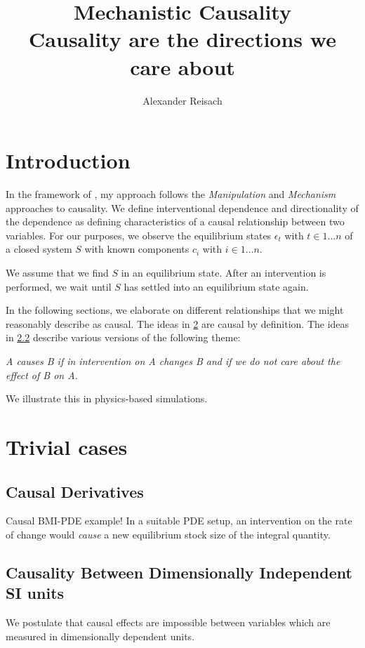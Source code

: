 \documentclass{article}
\title{Mechanistic Causality\\
    \Large{Causality are the directions we care about}}
\author{Alexander Reisach}
\begin{document}
\maketitle
    
\section{Introduction}
In the framework of \cite{brady2008causation}, my approach follows the \emph{Manipulation} and \emph{Mechanism} approaches to causality. 
We define interventional dependence and directionality of the dependence as defining characteristics of a causal relationship between two variables.
For our purposes, we observe the equilibrium states $\epsilon_t$ with $t \in 1 \dots n$ of a closed system $S$ with known components $c_i$ with $i \in 1 \dots n$. 

We assume that we find $S$ in an equilibrium state. After an intervention is performed, we wait until $S$ has settled into an equilibrium state again.

In the following sections, we elaborate on different relationships that we might reasonably describe as causal. The ideas in \cref{sec:trivial} are causal by definition. The ideas in \cref{sec:units} describe various versions of the following theme:
\begin{center}
    \emph{A causes B if in intervention on A changes B and if we do not care about the effect of B on A.}
\end{center}
\noindent
We illustrate this in physics-based simulations.

\section{Trivial cases} \label{sec:trivial}

\subsection{Causal Derivatives} \label{sec:derivatives}
Causal BMI-PDE example!
In a suitable PDE setup, an intervention on the rate of change would \emph{cause} a new equilibrium stock size of the integral quantity.

\subsection{Causality Between Dimensionally Independent SI units}\label{sec:units}
We postulate that causal effects are impossible between variables which are measured in dimensionally dependent units.
\end{document}
